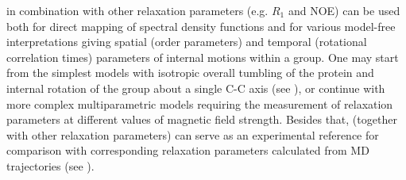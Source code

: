 \documentclass[twocolumn]{svjour3}           %
\begin{document}
\gtwoCH{} in combination with other relaxation parameters (e.g. $R_1$ 
and NOE) can be used both for direct mapping of spectral density functions
\cite{kaderavek_spectral_2016}  and for various model-free interpretations 
giving spatial (order parameters) and temporal (rotational correlation 
times) parameters of internal motions within a \CHtwo{} group. One may 
start from the simplest models with isotropic overall tumbling of the 
protein and internal rotation of the \CHtwo{} group about a single C-C 
axis (see 
\cite{daragan_motional_1997,zheng_measurement_2004,daragan_using_1995}), 
or continue with more complex multiparametric models
\cite{paquin_multiple-timescale_2008,ferrage_chapter_2017,ghalebani_nmr_2008,kaderavek_spectral_2016} 
requiring the measurement of relaxation parameters at different values 
of magnetic field strength. Besides that, \gtwoCH{} (together with other
relaxation parameters) can serve as an experimental reference for
comparison with corresponding relaxation parameters calculated from MD
trajectories (see \cite{aliev_motional_2014}).
\end{document}
